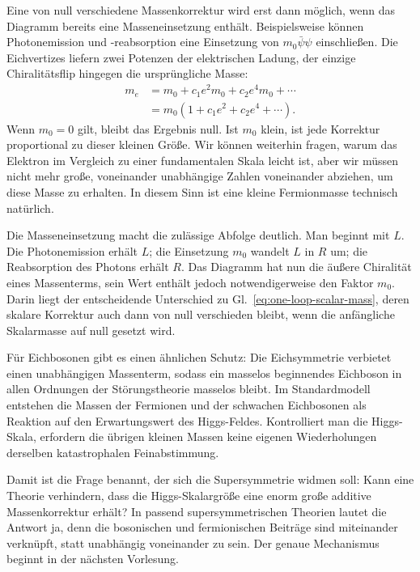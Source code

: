 Eine von null verschiedene Massenkorrektur wird erst dann möglich, wenn das Diagramm bereits eine Masseneinsetzung enthält. Beispielsweise können Photonemission und -reabsorption eine Einsetzung von \(m_0\bar\psi\psi\) einschließen. Die Eichvertizes liefern zwei Potenzen der elektrischen Ladung, der einzige Chiralitätsflip hingegen die ursprüngliche Masse:
\begin{equation}
\begin{aligned}
m_e
&=m_0+c_1e^2m_0+c_2e^4m_0+\cdots\\
&=m_0\left(1+c_1e^2+c_2e^4+\cdots\right).
\end{aligned}
\label{eq:multiplicative-fermion-mass}
\end{equation}
Wenn \(m_0=0\) gilt, bleibt das Ergebnis null. Ist \(m_0\) klein, ist jede Korrektur proportional zu dieser kleinen Größe. Wir können weiterhin fragen, warum das Elektron im Vergleich zu einer fundamentalen Skala leicht ist, aber wir müssen nicht mehr große, voneinander unabhängige Zahlen voneinander abziehen, um diese Masse zu erhalten. In diesem Sinn ist eine kleine Fermionmasse technisch natürlich.

Die Masseneinsetzung macht die zulässige Abfolge deutlich. Man beginnt mit \(L\). Die Photonemission erhält \(L\); die Einsetzung \(m_0\) wandelt \(L\) in \(R\) um; die Reabsorption des Photons erhält \(R\). Das Diagramm hat nun die äußere Chiralität eines Massenterms, sein Wert enthält jedoch notwendigerweise den Faktor \(m_0\). Darin liegt der entscheidende Unterschied zu Gl.~\eqref{eq:one-loop-scalar-mass}, deren skalare Korrektur auch dann von null verschieden bleibt, wenn die anfängliche Skalarmasse auf null gesetzt wird.

Für Eichbosonen gibt es einen ähnlichen Schutz: Die Eichsymmetrie verbietet einen unabhängigen Massenterm, sodass ein masselos beginnendes Eichboson in allen Ordnungen der Störungstheorie masselos bleibt. Im Standardmodell entstehen die Massen der Fermionen und der schwachen Eichbosonen als Reaktion auf den Erwartungswert des Higgs-Feldes. Kontrolliert man die Higgs-Skala, erfordern die übrigen kleinen Massen keine eigenen Wiederholungen derselben katastrophalen Feinabstimmung.

Damit ist die Frage benannt, der sich die Supersymmetrie widmen soll: Kann eine Theorie verhindern, dass die Higgs-Skalargröße eine enorm große additive Massenkorrektur erhält? In passend supersymmetrischen Theorien lautet die Antwort ja, denn die bosonischen und fermionischen Beiträge sind miteinander verknüpft, statt unabhängig voneinander zu sein. Der genaue Mechanismus beginnt in der nächsten Vorlesung.

